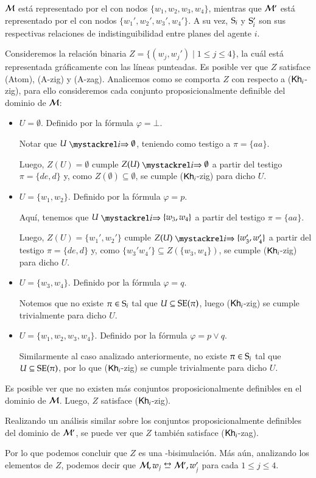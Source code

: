 \begin{ejemplo}
    $\modults$ está representado por el \ults con nodos $\{w_1,w_2,w_3,w_4\}$, mientras que $\modults'$ está representado 
    por el \ults con nodos $\{w_1',w_2',w_3',w_4'\}$. A su vez, $\S_i$ y $\S'_i$ son sus respectivas relaciones de indistinguibilidad 
    entre planes del agente $i$.

    Consideremos la relación binaria $Z = \{(w_j, w_j') \mid 1 \leq j \leq 4\}$, la cuál está representada gráficamente con las líneas 
    punteadas. Es posible ver que $Z$ satisface (Atom), (A-zig) y (A-zag). Analicemos como se comporta $Z$ con respecto a ($\khi$-zig), para ello 
    consideremos cada conjunto proposicionalmente definible del dominio de $\modults$:
    \begin{itemize}
       \item $U = \emptyset$. Definido por la fórmula $\varphi = \bot$.

       Notar que $U \ultsExecAgi \emptyset$, teniendo como testigo a $\pi = \{aa\}$.

       Luego, $Z(U) = \emptyset$ cumple $Z(U) \ultsExecAgi \emptyset$ a partir del testigo $\pi = \{de,d\}$ y, 
       como $Z(\emptyset) \subseteq \emptyset$, se cumple ($\khi$-zig) para dicho $U$.
       \item $U = \{w_1,w_2\}$. Definido por la fórmula $\varphi = p$.
       
       Aquí, tenemos que $U \ultsExecAgi \{w_3,w_4\}$ a partir del testigo $\pi = \{aa\}$.

       Luego, $Z(U) = \{w_1',w_2'\}$ cumple $Z(U) \ultsExecAgi \{w_3',w_4'\}$ a partir del testigo $\pi = \{de,d\}$ y, 
       como $\{w_3'w_4'\} \subseteq Z(\{w_3,w_4\})$, se cumple ($\khi$-zig) para dicho $U$.
       \item $U = \{w_3,w_4\}$. Definido por la fórmula $\varphi = q$.
       
       Notemos que no existe $\pi \in \S_i$ tal que $U \subseteq \sexec(\pi)$, luego ($\khi$-zig) se cumple trivialmente para dicho $U$.
       \item $U = \{w_1,w_2,w_3,w_4\}$. Definido por la fórmula $\varphi = p \vee q$. 
       
       Similarmente al caso analizado anteriormente, no existe $\pi \in \S_i$ tal que $U \subseteq \sexec(\pi)$, por lo que ($\khi$-zig) se 
       cumple trivialmente para dicho $U$.
    \end{itemize}
    Es posible ver que no existen más conjuntos proposicionalmente definibles en el dominio de $\modults$. Luego, $Z$ satisface ($\khi$-zig).
    
    Realizando un análisis similar sobre los conjuntos proposicionalmente definibles del dominio de $\modults'$, se puede ver que $Z$ también 
    satisface ($\khi$-zag).
    
    Por lo que podemos concluir que $Z$ es una \KHilogic-bisimulación. Más aún, analizando los elementos de $Z$, podemos decir que 
    $\modults,w_j \bisim \modults',w_j'$ para cada $1 \leq j \leq 4$. 
\end{ejemplo}


